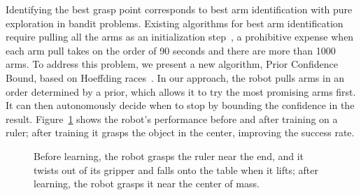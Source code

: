 \documentclass{article}
\newcommand{\algorithmDTxt}{Prior Confidence Bound\xspace}
\begin{document}
Identifying the best grasp point corresponds to best arm
identification with pure exploration in bandit problems.  Existing
algorithms for best arm identification require pulling all the arms as
an initialization step~\citep{mannor04, audibert10, chen14}, a
prohibitive expense when each arm pull takes on the order of 90
seconds and there are more than 1000 arms.  To address this problem,
we present a new algorithm, \algorithmDTxt, based on Hoeffding
races~\citep{maron93}. In our approach, the robot pulls arms in an order
determined by a prior, which allows it to try the most promising arms
first. It can then autonomously decide when to stop by bounding the
confidence in the result.  Figure~\ref{fig:ruler} shows the robot's
performance before and after training on a ruler; after training it
grasps the object in the center, improving the success rate.
\begin{figure}
%
\caption{Before learning, the robot grasps the ruler near the end, and it twists out of its gripper and falls onto the table when it lifts; after learning, the robot grasps it near the center of mass.\label{fig:ruler}}
\end{figure}
\end{document}
